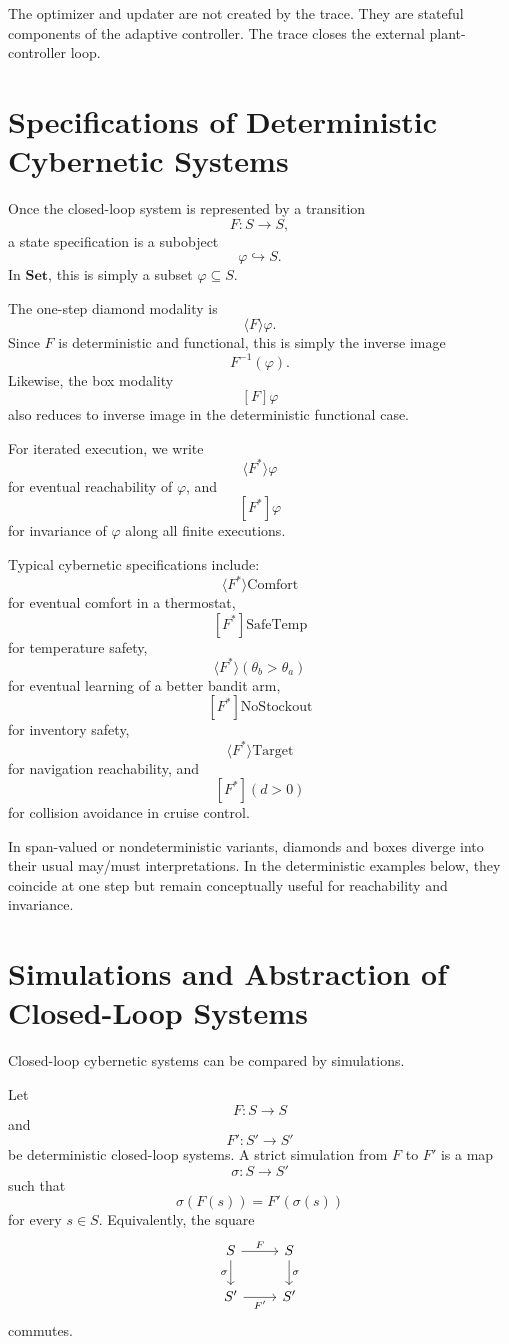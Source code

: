 The optimizer and updater are not created by the trace.  They are stateful components of the
adaptive controller.  The trace closes the external plant-controller loop.

\section{Specifications of Deterministic Cybernetic Systems}
\label{sec:cybernetic-specifications}

Once the closed-loop system is represented by a transition
\[
F:S\longrightarrow S,
\]
a state specification is a subobject
\[
\varphi\hookrightarrow S.
\]
In \(\mathbf{Set}\), this is simply a subset \(\varphi\subseteq S\).

The one-step diamond modality is
\[
\langle F\rangle\varphi.
\]
Since \(F\) is deterministic and functional, this is simply the inverse image
\[
F^{-1}(\varphi).
\]
Likewise, the box modality
\[
[F]\varphi
\]
also reduces to inverse image in the deterministic functional case.

For iterated execution, we write
\[
\langle F^*\rangle \varphi
\]
for eventual reachability of \(\varphi\), and
\[
[F^*]\varphi
\]
for invariance of \(\varphi\) along all finite executions.

Typical cybernetic specifications include:
\[
\langle F^*\rangle\mathrm{Comfort}
\]
for eventual comfort in a thermostat,
\[
[F^*]\mathrm{SafeTemp}
\]
for temperature safety,
\[
\langle F^*\rangle(\theta_b>\theta_a)
\]
for eventual learning of a better bandit arm,
\[
[F^*]\mathrm{NoStockout}
\]
for inventory safety,
\[
\langle F^*\rangle\mathrm{Target}
\]
for navigation reachability, and
\[
[F^*](d>0)
\]
for collision avoidance in cruise control.

In span-valued or nondeterministic variants, diamonds and boxes diverge into their usual may/must
interpretations.  In the deterministic examples below, they coincide at one step but remain
conceptually useful for reachability and invariance.

\section{Simulations and Abstraction of Closed-Loop Systems}
\label{sec:cybernetic-simulations}

Closed-loop cybernetic systems can be compared by simulations.

\begin{definition}
\label{def:strict-closed-loop-simulation}
Let
\[
F:S\longrightarrow S
\]
and
\[
F':S'\longrightarrow S'
\]
be deterministic closed-loop systems.  A strict simulation from \(F\) to \(F'\) is a map
\[
\sigma:S\longrightarrow S'
\]
such that
\[
\sigma(F(s))=F'(\sigma(s))
\]
for every \(s\in S\).
Equivalently, the square
\[
\begin{tikzcd}
S \arrow[r,"F"] \arrow[d,"\sigma"'] & S \arrow[d,"\sigma"] \\
S' \arrow[r,"F'"'] & S'
\end{tikzcd}
\]
commutes.
\end{definition}

